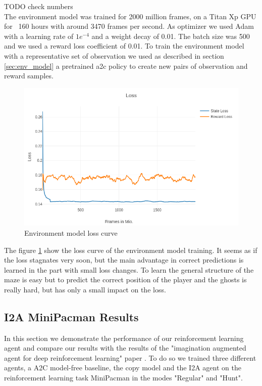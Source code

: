 TODO check numbers\\
The environment model was trained for 2000 million frames, on a Titan Xp GPU for ~160 hours with around 3470 frames per second. As optimizer we used Adam with a learning rate of $1e^{-4}$ and a weight decay of 0.01. The batch size was 500 and we used a reward loss coefficient of 0.01. To train the environment model with a representative set of observation we used as described in section \ref{sec:env_model} a pretrained a2c policy to create new pairs of observation and reward samples.

\begin{figure}[H] 
  \centering   
  \includegraphics[width=0.7\columnwidth]{./Images/hunt_env_loss_curve.png}
  \caption{Environment model loss curve} 
  \label{fig:env_model_loss} 
\end{figure} 

The figure \ref{fig:env_model_loss} show the loss curve of the environment model training. It seems as if the loss stagnates very soon, but the main advantage in correct predictions is learned in the part with small loss changes. To learn the general structure of the maze is easy but to predict the correct position of the player and the ghosts is really hard, but has only a small impact on the loss.\\




\subsection{I2A MiniPacman Results}

In this section we demonstrate the performance of our reinforcement learning agent and compare our results with the results of the "imagination augmented agent for deep reinforcement learning" paper \cite{I2A}.
To do so we trained three different agents, a A2C model-free baseline, the copy model and the I2A agent on the reinforcement learning task MiniPacman in the modes "Regular" and "Hunt".\\


